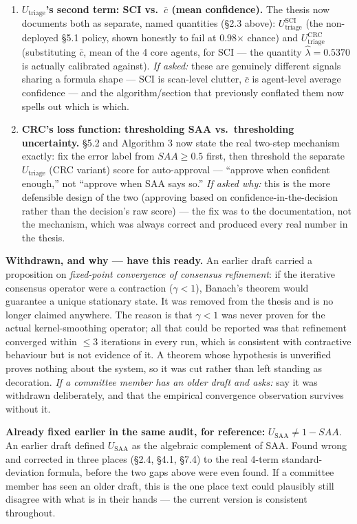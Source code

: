 \documentclass[11pt,a4paper]{article}
\begin{document}
\begin{enumerate}[leftmargin=1.6em]
\item \textbf{$U_{\text{triage}}$'s second term: SCI vs.\ $\bar{c}$ (mean confidence).} The thesis now documents both as separate, named quantities (\S2.3 above): $U^{\text{SCI}}_{\text{triage}}$ (the non-deployed \S5.1 policy, shown honestly to fail at 0.98$\times$ chance) and $U^{\text{CRC}}_{\text{triage}}$ (substituting $\bar{c}$, mean of the 4 core agents, for SCI --- the quantity $\hat\lambda=0.5370$ is actually calibrated against). \emph{If asked:} these are genuinely different signals sharing a formula shape --- SCI is scan-level clutter, $\bar{c}$ is agent-level average confidence --- and the algorithm/section that previously conflated them now spells out which is which.
\item \textbf{CRC's loss function: thresholding SAA vs.\ thresholding uncertainty.} \S5.2 and Algorithm 3 now state the real two-step mechanism exactly: fix the error label from $SAA \ge 0.5$ first, then threshold the separate $U_{\text{triage}}$ (CRC variant) score for auto-approval --- ``approve when confident enough,'' not ``approve when SAA says so.'' \emph{If asked why:} this is the more defensible design of the two (approving based on confidence-in-the-decision rather than the decision's raw score) --- the fix was to the documentation, not the mechanism, which was always correct and produced every real number in the thesis.
\end{enumerate}

\noindent\textbf{Withdrawn, and why --- have this ready.} An earlier draft carried a proposition on \emph{fixed-point convergence of consensus refinement}: if the iterative consensus operator were a contraction ($\gamma<1$), Banach's theorem would guarantee a unique stationary state. It was removed from the thesis and is no longer claimed anywhere. The reason is that $\gamma<1$ was never proven for the actual kernel-smoothing operator; all that could be reported was that refinement converged within $\le 3$ iterations in every run, which is consistent with contractive behaviour but is not evidence of it. A theorem whose hypothesis is unverified proves nothing about the system, so it was cut rather than left standing as decoration. \emph{If a committee member has an older draft and asks:} say it was withdrawn deliberately, and that the empirical convergence observation survives without it.

\noindent\textbf{Already fixed earlier in the same audit, for reference:} $U_{\text{SAA}} \neq 1-SAA$. An earlier draft defined $U_{\text{SAA}}$ as the algebraic complement of SAA. Found wrong and corrected in three places (\S2.4, \S4.1, \S7.4) to the real 4-term standard-deviation formula, before the two gaps above were even found. If a committee member has seen an older draft, this is the one place text could plausibly still disagree with what is in their hands --- the current version is consistent throughout.
\end{document}

